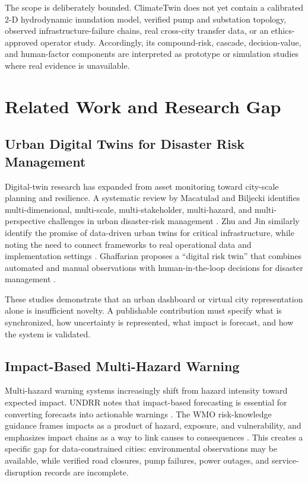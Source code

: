 \documentclass[journal]{IEEEtran}
\begin{document}
The scope is deliberately bounded. ClimateTwin does not yet contain a calibrated 2-D hydrodynamic inundation model, verified pump and substation topology, observed infrastructure-failure chains, real cross-city transfer data, or an ethics-approved operator study. Accordingly, its compound-risk, cascade, decision-value, and human-factor components are interpreted as prototype or simulation studies where real evidence is unavailable.

\section{Related Work and Research Gap}
\subsection{Urban Digital Twins for Disaster Risk Management}
Digital-twin research has expanded from asset monitoring toward city-scale planning and resilience. A systematic review by Macatulad and Biljecki identifies multi-dimensional, multi-scale, multi-stakeholder, multi-hazard, and multi-perspective challenges in urban disaster-risk management \cite{macatulad2024}. Zhu and Jin similarly identify the promise of data-driven urban twins for critical infrastructure, while noting the need to connect frameworks to real operational data and implementation settings \cite{zhu2025}. Ghaffarian proposes a ``digital risk twin'' that combines automated and manual observations with human-in-the-loop decisions for disaster management \cite{ghaffarian2025}.

These studies demonstrate that an urban dashboard or virtual city representation alone is insufficient novelty. A publishable contribution must specify what is synchronized, how uncertainty is represented, what impact is forecast, and how the system is validated.

\subsection{Impact-Based Multi-Hazard Warning}
Multi-hazard warning systems increasingly shift from hazard intensity toward expected impact. UNDRR notes that impact-based forecasting is essential for converting forecasts into actionable warnings \cite{undrr2024}. The WMO risk-knowledge guidance frames impacts as a product of hazard, exposure, and vulnerability, and emphasizes impact chains as a way to link causes to consequences \cite{wmo2024}. This creates a specific gap for data-constrained cities: environmental observations may be available, while verified road closures, pump failures, power outages, and service-disruption records are incomplete.
\end{document}
